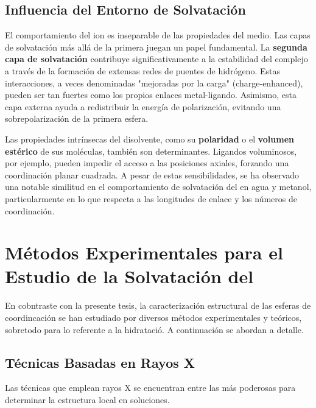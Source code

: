 \subsection{Influencia del Entorno de Solvatación}

El comportamiento del ion  es inseparable de las propiedades del medio. Las capas de solvatación más allá de la primera juegan un papel fundamental. La \textbf{segunda capa de solvatación} contribuye significativamente a la estabilidad del complejo a través de la formación de extensas redes de puentes de hidrógeno. Estas interacciones, a veces denominadas "mejoradas por la carga" (charge-enhanced), pueden ser tan fuertes como los propios enlaces metal-ligando. Asimismo, esta capa externa ayuda a redistribuir la energía de polarización, evitando una sobrepolarización de la primera esfera.

Las propiedades intrínsecas del disolvente, como su \textbf{polaridad} o el \textbf{volumen estérico} de sus moléculas, también son determinantes. Ligandos voluminosos, por ejemplo, pueden impedir el acceso a las posiciones axiales, forzando una coordinación planar cuadrada. A pesar de estas sensibilidades, se ha observado una notable similitud en el comportamiento de solvatación del  en agua y metanol, particularmente en lo que respecta a las longitudes de enlace y los números de coordinación.


\section{Métodos Experimentales para el Estudio de la Solvatación del }

En cobntraste con la presente tesis, la caracterización estructural de las esferas de coordincación se han estudiado por diversos métodos experimentales y teóricos, sobretodo para lo referente a la hidratació. A continuación se abordan a detalle. 

\subsection{Técnicas Basadas en Rayos X}

Las técnicas que emplean rayos X se encuentran entre las más poderosas para determinar la estructura local en soluciones.

